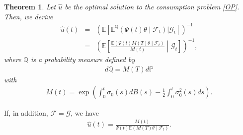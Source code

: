 \documentclass[12pt]{article}
\newtheorem{theorem}{Theorem}[section]
\theoremstyle{remark}
\numberwithin{equation}{section}
\def\P{\mathbb P}
\begin{document}
\begin{theorem}
Let $\hat{u}$ be the optimal solution to the consumption problem \eqref{OP}. Then, we derive
\begin{eqnarray*}
\hat{u}(t)&=& \left(\mathbb{E}\left[ \mathbb{E}^{\mathbb{Q}}\left(\Psi(t)\theta\middle|\mathcal{F}_t\right)|\mathcal{G}_t\right]\right)^{-1}\\
&=& \left(\mathbb{E}\left[\frac{\mathbb{E}\left(\Psi(t)M(T)\theta\middle|\mathcal{F}_t\right)}{M(t)}\middle|\mathcal{G}_t\right]\right)^{-1},
\end{eqnarray*}
where $\mathbb{Q}$ is a probability measure defined by
\begin{eqnarray}\label{Gir}
	 d\mathbb{Q}=M(T)d\P
\end{eqnarray}
 with
\begin{eqnarray*}
	M(t)=\exp\left(\int_0^t\sigma_0(s)dB(s)-\frac{1}{2}\int_0^t\sigma_0^2(s)ds\right).
\end{eqnarray*}
\end{theorem}
If, in addition, $\mathcal{F}=\mathcal{G}$, we have
\begin{eqnarray*}
	\hat{u}(t)=\frac{M(t)}{\Psi(t)\mathbb{E}\left(M(T)\theta\middle|\mathcal{F}_t\right)}.
\end{eqnarray*}
\end{document}
